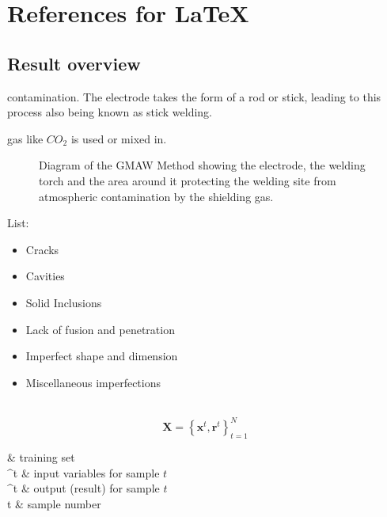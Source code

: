 \chapter{References for \LaTeX} %
\section{Result overview}
    
contamination.  The electrode takes the form of a rod or stick, leading to this process also being known as stick welding.

gas like \(CO_2\) is used or mixed in. 

    
\begin{figure}[!htbp]
    \centering
    \caption{Diagram of the GMAW Method showing the electrode, the welding torch and the area around it protecting the welding site from atmospheric contamination by the shielding gas. }
    \label{fig:gmaw_nozzle}
\end{figure}
    


List:


\begin{itemize}
    \item Cracks
    \item Cavities
    \item Solid Inclusions
    \item Lack of fusion and penetration
    \item Imperfect shape and dimension
    \item Miscellaneous imperfections
\end{itemize}



\HRule\\

    
\begin{equation}
    \mathbf{X} = \left\lbrace \mathbf{x}^t,\mathbf{r}^t \right\rbrace_{t=1}^N\
    \label{eq:dataset}
\end{equation}

\begin{conditions}
     & training set\\
    ^t & input variables for sample \(t\) \\
    ^t & output (result) for sample \(t\) \\
    t & sample number\\
\end{conditions}

